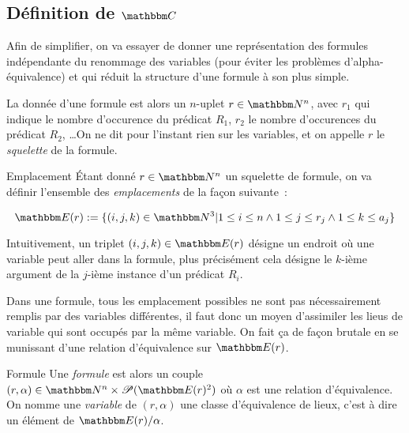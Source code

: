 

\subsection{Définition de $\C$}

Afin de simplifier, on va essayer de donner une représentation des formules indépendante
du renommage des variables (pour éviter les problèmes d'alpha-équivalence) et qui réduit
la structure d'une formule à son plus simple.

La donnée d'une formule est alors un $n$-uplet $r\in\N^n$, avec $r_1$ qui indique le
nombre d'occurence du prédicat $R_1$, $r_2$ le nombre d'occurences du prédicat $R_2$,
\dots On ne dit pour l'instant rien sur les variables, et on appelle $r$ le 
\emph{squelette} de la formule.

\begin{defi}{Emplacement}
    Étant donné $r\in\N^n$ un squelette de formule, on va définir l'ensemble des
    \emph{emplacements} de la façon suivante~:

    \[ \E(r):= \{(i,j,k)\in\N^3 |        1\leq i\leq n
                                  \wedge 1\leq j\leq r_j
                                  \wedge 1\leq k\leq a_j\} \]

    Intuitivement, un triplet $(i,j,k)\in\E(r)$ désigne un endroit où une variable peut
    aller dans la formule, plus précisément cela désigne le $k$-ième argument de la
    $j$-ième instance d'un prédicat $R_i$.
\end{defi}

Dans une formule, tous les emplacement possibles ne sont pas nécessairement remplis
par des variables différentes, il faut donc un moyen d'assimiler les lieus de variable
qui sont occupés par la même variable. On fait ça de façon brutale en se munissant d'une
relation d'équivalence sur $\E(r)$.

\begin{defi}{Formule}
    Une \emph{formule} est alors un couple $(r,\alpha)\in\N^n\times\P(\E(r)^2)$
    où $\alpha$ est une relation d'équivalence. On nomme une \emph{variable} de
    $(r,\alpha)$ une classe d'équivalence de lieux, c'est à dire un élément de
    $\E(r)/\alpha$.
\end{defi}

